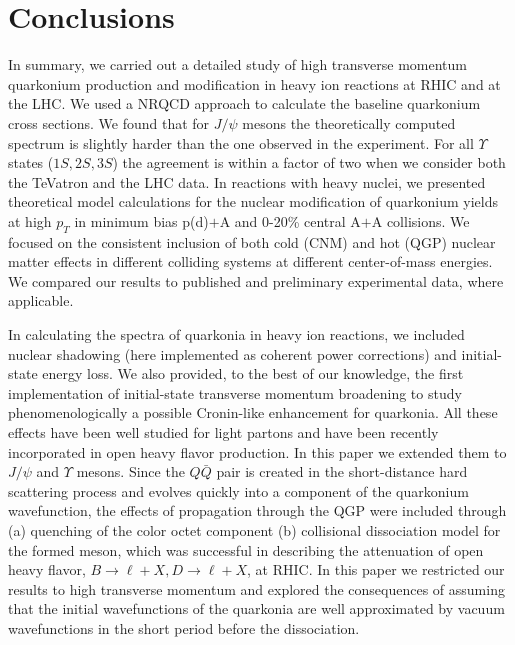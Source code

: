 \documentclass[article,showpacs,preprintnumbers,amsmath,amssymb]{revtex4}
\newcommand{\barQ}{{\bar{Q}}}
\begin{document}
\section{Conclusions~\label{section:Conclusions}}


In summary, we carried out a detailed study of high transverse momentum
quarkonium production and modification in heavy ion reactions at RHIC and at
the LHC. We used  a NRQCD approach to calculate the
baseline quarkonium cross sections. We found that for $J/\psi$ mesons the
theoretically computed spectrum is slightly harder than the one observed in the
experiment. For all $\Upsilon$ states ($1S, 2S, 3S$) the agreement is within a
factor of two when we consider both the TeVatron and the LHC data.  In
reactions with heavy nuclei, we presented theoretical model calculations for the
nuclear modification of quarkonium yields at high $p_T$ in minimum bias p(d)$+$A
and  0-20\% central  A$+$A collisions.  We focused on the consistent inclusion of
both cold (CNM) and hot (QGP) nuclear matter effects in different colliding
systems at different center-of-mass energies. We compared our results to
published and preliminary experimental data, where applicable.    


In calculating the spectra of quarkonia in heavy ion reactions, 
we included nuclear shadowing (here implemented as coherent power corrections) 
and initial-state energy loss. We also provided, to the best of our knowledge, 
the first implementation of initial-state  transverse momentum broadening  
to study  phenomenologically a possible Cronin-like enhancement for quarkonia. 
All these effects have been well studied for light partons and have been 
recently incorporated in open heavy flavor production. In this paper we extended 
them to $J/\psi$ and $\Upsilon$ mesons. Since the $Q\barQ$ pair is created in the
short-distance hard scattering process and  evolves quickly into a component
of the quarkonium wavefunction, the effects of propagation through the QGP 
were included through (a) quenching of the color octet component (b) collisional 
dissociation model for the formed meson, which was successful 
in describing the attenuation of open heavy flavor, $B\rightarrow \ell+X, 
D\rightarrow \ell+X$, at RHIC. In this paper we restricted our results to  
high transverse momentum and explored the consequences of assuming that
the initial wavefunctions of the quarkonia are well approximated by 
vacuum wavefunctions in the short period before the dissociation.
\end{document}
